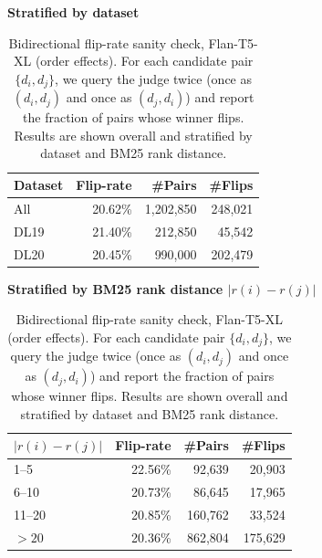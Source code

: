 \documentclass{llmxive}
\providecommand{\arraystretch}{1.00}
\begin{document}
\begin{table}[!hbp]
\centering
\small
\renewcommand{\arraystretch}{1.15}
\setlength{\tabcolsep}{6pt}

\begin{minipage}[t]{0.48\textwidth}
\centering
\textbf{Stratified by dataset}\\[2pt]
\begin{tabular}{lrrr}
\hline
Dataset & Flip-rate & \#Pairs & \#Flips \\
\hline
All   & 20.62\% & 1,202,850 & 248,021 \\
DL19  & 21.40\% &   212,850 &  45,542 \\
DL20  & 20.45\% &   990,000 & 202,479 \\
\hline
\end{tabular}
\end{minipage}\hfill
\begin{minipage}[t]{0.48\textwidth}
\centering
\textbf{Stratified by BM25 rank distance $|r(i)-r(j)|$}\\[2pt]
\begin{tabular}{lrrr}
\hline
$|r(i)-r(j)|$ & Flip-rate & \#Pairs & \#Flips \\
\hline
1--5    & 22.56\% &  92,639 &  20,903 \\
6--10   & 20.73\% &  86,645 &  17,965 \\
11--20  & 20.85\% & 160,762 &  33,524 \\
$>20$   & 20.36\% & 862,804 & 175,629 \\
\hline
\end{tabular}
\end{minipage}

\caption{Bidirectional flip-rate sanity check, Flan-T5-XL (order effects). For each candidate pair $\{d_i,d_j\}$, we query the judge twice (once as $(d_i,d_j)$ and once as $(d_j,d_i)$) and report the fraction of pairs whose winner flips. Results are shown overall and stratified by dataset and BM25 rank distance.}
\label{tab:flip_rate_order_effects}
\end{table}
\end{document}

